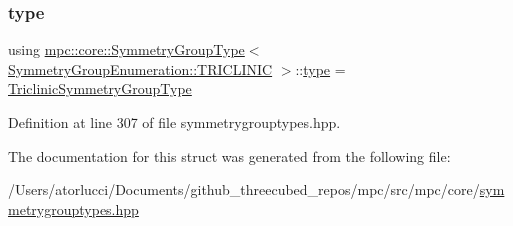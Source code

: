 \subsubsection{\texorpdfstring{type}{type}}
{\footnotesize\ttfamily using \mbox{\hyperlink{structmpc_1_1core_1_1_symmetry_group_type}{mpc\+::core\+::\+Symmetry\+Group\+Type}}$<$ \mbox{\hyperlink{namespacempc_1_1core_a9d979684062547055a0ef5c13077bad8a049b6e2743d57033eacaea302ca6710a}{Symmetry\+Group\+Enumeration\+::\+T\+R\+I\+C\+L\+I\+N\+IC}} $>$\+::\mbox{\hyperlink{structmpc_1_1core_1_1_symmetry_group_type_3_01_symmetry_group_enumeration_1_1_t_r_i_c_l_i_n_i_c_01_4_a952cb9fbd79d703e60ec18fb7f82f806}{type}} =  \mbox{\hyperlink{structmpc_1_1core_1_1_triclinic_symmetry_group_type}{Triclinic\+Symmetry\+Group\+Type}}}



Definition at line 307 of file symmetrygrouptypes.\+hpp.



The documentation for this struct was generated from the following file\+:\begin{DoxyCompactItemize}
\item 
/\+Users/atorlucci/\+Documents/github\+\_\+threecubed\+\_\+repos/mpc/src/mpc/core/\mbox{\hyperlink{symmetrygrouptypes_8hpp}{symmetrygrouptypes.\+hpp}}\end{DoxyCompactItemize}
